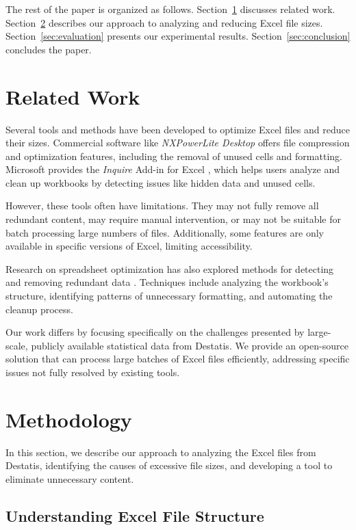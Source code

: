 \documentclass[sigconf]{acmart}
\begin{document}
The rest of the paper is organized as follows. Section~\ref{sec:related_work} discusses related work. Section~\ref{sec:methodology} describes our approach to analyzing and reducing Excel file sizes. Section~\ref{sec:evaluation} presents our experimental results. Section~\ref{sec:conclusion} concludes the paper.

\section{Related Work}
\label{sec:related_work}

Several tools and methods have been developed to optimize Excel files and reduce their sizes. Commercial software like \textit{NXPowerLite Desktop} \cite{neuxpower2024nxpowerlite} offers file compression and optimization features, including the removal of unused cells and formatting. Microsoft provides the \textit{Inquire} Add-in for Excel \cite{inquire_addin}, which helps users analyze and clean up workbooks by detecting issues like hidden data and unused cells.

However, these tools often have limitations. They may not fully remove all redundant content, may require manual intervention, or may not be suitable for batch processing large numbers of files. Additionally, some features are only available in specific versions of Excel, limiting accessibility.

Research on spreadsheet optimization has also explored methods for detecting and removing redundant data \cite{spreadsheet_reduction}. Techniques include analyzing the workbook's structure, identifying patterns of unnecessary formatting, and automating the cleanup process.

Our work differs by focusing specifically on the challenges presented by large-scale, publicly available statistical data from Destatis. We provide an open-source solution that can process large batches of Excel files efficiently, addressing specific issues not fully resolved by existing tools.

\section{Methodology}
\label{sec:methodology}

In this section, we describe our approach to analyzing the Excel files from Destatis, identifying the causes of excessive file sizes, and developing a tool to eliminate unnecessary content.

\subsection{Understanding Excel File Structure}
\end{document}
